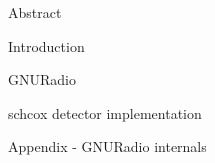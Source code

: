 




\usepackage{antropy_en}


  

  \begin{topchapter}{Abstract}
    
  \end{topchapter}

  \begin{topchapter}{Introduction}
    
  \end{topchapter}

  \begin{topchapter}{GNURadio}
    
  \end{topchapter}

  \begin{topchapter}{\acrlong{schcox} detector implementation}
    
  \end{topchapter}

  \begin{topchapter}{Appendix - GNURadio internals}
    
  \end{topchapter}

  \newpage
  \printglossaries
  \printbibliography

